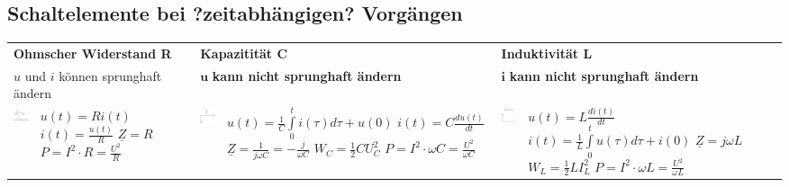    	\subsection{Schaltelemente bei ?zeitabhängigen? Vorgängen}
   		\begin{tabular}{p{1.5cm} p{4.3cm} p{1.5cm} p{4.3cm} p{1.5cm} p{4.3cm}}
   	   		\multicolumn{2}{l}{\textbf{Ohmscher Widerstand R}}
   	   			& \multicolumn{2}{l}{\textbf{Kapazitität C}}
   	   			& \multicolumn{2}{l}{\textbf{Induktivität L}} \\
   	   		\multicolumn{2}{l}{$u$ und $i$ können sprunghaft ändern}
   	   			& \multicolumn{2}{l}{$\mathbf{u}$ \textbf{kann nicht sprunghaft ändern}}
   	   			& \multicolumn{2}{l}{$\mathbf{i}$ \textbf{kann nicht sprunghaft ändern}} \\
   	   		\parbox{1.5cm}{
   				\includegraphics[width=1.5cm]{./images/zeigerdiag-r.png}}
   				& \parbox{4.3cm}{$u(t) = R i(t)$ \\
   					$i(t) = \frac{u(t)}{R}$ \\
   					$\underline{Z} = R$ \\
   					$P=I^2 \cdot R = \frac{U^2}{R}$}
   	   			& \parbox{1.5cm}{
   					\includegraphics[width=1.5cm]{./images/zeigerdiag-c.png}}
   				& \parbox{4.3cm}{
   					$u(t) = \frac1C \int\limits_0^t i(\tau) d\tau + u(0)$ \\
   					$i(t) = C \frac{d u(t)}{dt}$ \\
   					$\underline{Z} = \frac{1}{j \omega C} = - \frac{j}{\omega C}$ \\
   					$W_C=\frac12 C U_C^2$\\
   					$P= I^2 \cdot \omega C = \frac{U^2}{\omega C}$}
   	   			& \parbox{1.5cm}{
   					\includegraphics[width=1.5cm]{./images/zeigerdiag-l.png}}
   				& \parbox{4.3cm}{
   					$u(t) = L \frac{di(t)}{dt}$ \\
   					$i(t) = \frac1L \int\limits_0^t u(\tau) d\tau + i(0)$ \\
   					$\underline{Z} = j \omega L$ \\
   					$W_L=\frac12 L I_L^2$\\
   					$P= I^2 \cdot \omega L = \frac{U^2}{\omega L}$}
   	   	\end{tabular}
   	
